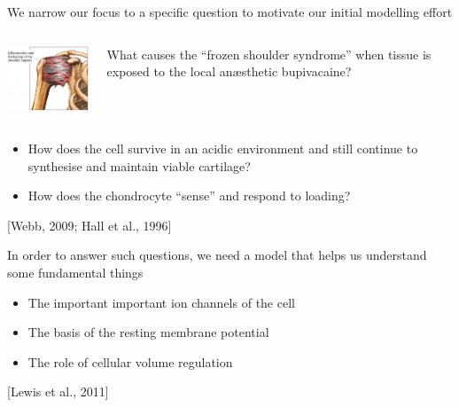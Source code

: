 \documentclass[ignorenonframetext]{beamer}
\newcommand{\references}[1] {
  \begin{flushright}
    \scriptsize [#1] \normalsize
  \end{flushright}
}
\begin{document}
\begin{frame}{We narrow our focus to a specific question to motivate
    our initial modelling effort}

  \begin{columns}
    \begin{column}{4.5cm}
      \begin{center}
        \includegraphics[width=4cm]{../images/pdf/frozen-shoulder}
      \end{center}
    \end{column}
    \begin{column}{6cm}
      What causes the ``frozen shoulder syndrome''
      when tissue is exposed to the local an\ae{}sthetic
      bupivacaine?
    \end{column}
  \end{columns}

  \vspace{0.5cm}
  \pause

  \begin{itemize}
  \item<2-> How does the cell survive in an acidic environment and
    still continue to synthesise and maintain viable cartilage?
  \item<2-> How does the chondrocyte ``sense'' and respond to loading?
  \end{itemize}

  \references{Webb, 2009; Hall et al., 1996}

\end{frame}

\begin{frame}{In order to answer such questions, we need a model that
    helps us understand some fundamental things}

  \begin{itemize}
  \item The important important ion channels of the cell\\[0.5cm]
  \item The basis of the resting membrane potential\\[0.5cm]
  \item The role of cellular volume regulation
  \end{itemize}

  \references{Lewis et al., 2011}

\end{frame}
\end{document}
